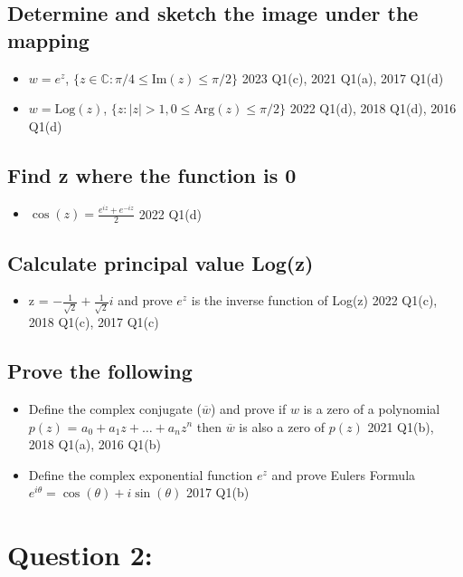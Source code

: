 \documentclass[a4paper, 8pt]{extarticle}
\begin{document}
\subsection{Determine and sketch the image under the mapping}
\begin{itemize}
    \item $w = e^z$, $\{z \in \mathbb{C} : \pi / 4 \leq \text{Im}(z) \leq \pi /2\}$ \hfill 2023 Q1(c), 2021 Q1(a), 2017 Q1(d)
    \item $w = \text{Log}(z)$, $\{z: |z| > 1, 0 \leq \text{Arg}(z) \leq \pi / 2\}$ \hfill 2022 Q1(d), 2018 Q1(d), 2016 Q1(d)
\end{itemize}
\subsection{Find z where the function is 0}
\begin{itemize}
    \item $\cos(z) = \frac{e^{iz} + e^{-iz}}{2}$ \hfill 2022 Q1(d)
\end{itemize}
\subsection{Calculate principal value Log(z)}
\begin{itemize}
    \item z = $-\frac{1}{\sqrt{2}} + \frac{1}{\sqrt{2}} i$ and prove $e^z$ is the inverse function of Log(z) \hfill 2022 Q1(c), 2018 Q1(c), 2017 Q1(c)
\end{itemize}
\subsection{Prove the following}
\begin{itemize}
    \item Define the complex conjugate ($\overline{w}$) and prove if $w$ is a zero of a polynomial $p(z)$ = $a_0 + a_1 z + \ldots + a_n z^n$ then $\overline{w}$ is also a zero of $p(z)$ \hfill 2021 Q1(b), 2018 Q1(a), 2016 Q1(b)
    \item Define the complex exponential function $e^z$ and prove Eulers Formula $e^{i \theta} = \cos(\theta) + i \sin(\theta)$ \hfill 2017 Q1(b)
\end{itemize}





\pagebreak

\section{Question 2: }
\end{document}
